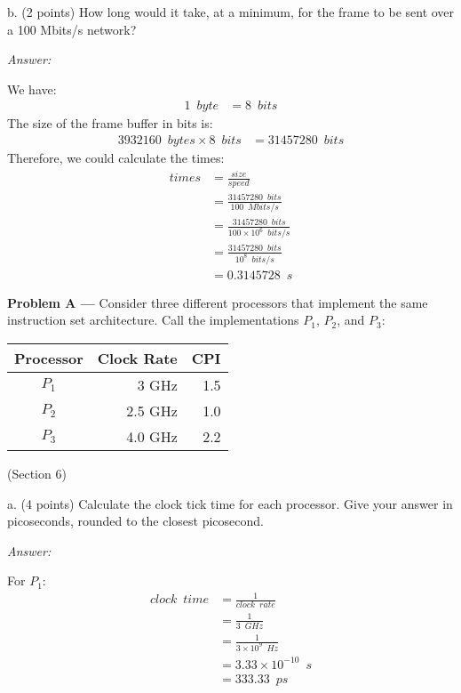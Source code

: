 \documentclass[11pt]{article}
\newcommand{\problem}[1]{\textbf{Problem #1 ---} }
\newcommand{\answer}{{\color{red}\textit{Answer: }}}
\begin{document}
b. (2 points) How long would it take, at a minimum, for the frame to be sent over a 100 Mbits/s network?

\answer

We have:
\begin{align*}
    1 \enspace byte &= 8 \enspace bits
\end{align*}
The size of the frame buffer in bits is:
\begin{align*}
    3932160 \enspace bytes \times 8 \enspace bits &= 31457280 \enspace bits 
\end{align*}
Therefore, we could calculate the times:
\begin{align*}
    times &= \frac{size}{speed} \\
          &= \frac{31457280 \enspace bits}{100 \enspace Mbits/s}\\
          &= \frac{31457280 \enspace bits}{100 \times 10^{6} \enspace bits/s}\\
          &= \frac{31457280 \enspace bits}{10^{8} \enspace bits/s}\\
          &= 0.3145728 \enspace s
\end{align*}

\problem{A} Consider three different processors that implement the same instruction set architecture.  Call the implementations $P_{1}$, $P_{2}$, and $P_{3}$:

\begin{center}
\begin{tabular}{c|r|r}
\textbf{Processor} & \textbf{Clock Rate} & \textbf{CPI} \\ \hline \hline
$P_{1}$ & 3 GHz & 1.5 \\ \hline
$P_{2}$ & 2.5 GHz & 1.0 \\ \hline
$P_{3}$ & 4.0 GHz & 2.2 \\
\end{tabular}
\end{center}
(Section 6)

a. (4 points) Calculate the clock tick time for each processor.  Give your answer in picoseconds, rounded to the closest picosecond.

\answer

For $P_1$: 
\begin{align*}
    clock \enspace time &= \frac{1}{clock \enspace rate} \\
                        &= \frac{1}{3 \enspace GHz} \\
                        &= \frac{1}{3 \times 10^{9} \enspace Hz} \\
                        &= 3.33 \times 10^{-10} \enspace s \\
                        &= 333.33 \enspace ps \\
\end{align*}
\end{document}
